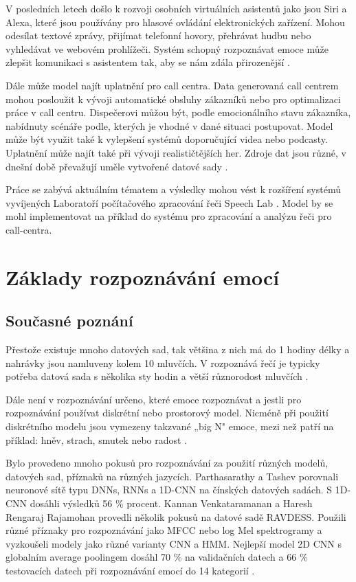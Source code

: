 \documentclass[FM,BP]{tulthesis}
\begin{document}
V posledních letech došlo k rozvoji osobních virtuálních asistentů jako jsou Siri a Alexa, které jsou používány pro hlasové ovládání elektronických zařízení. Mohou odesílat textové zprávy, přijímat telefonní hovory, přehrávat hudbu nebo vyhledávat ve webovém prohlížeči. Systém schopný rozpoznávat emoce může zlepšit komunikaci s asistentem tak, aby se nám zdála přirozenější \cite{DBLP:journals/corr/abs-1912-10458}.

Dále může model najít uplatnění pro call centra. Data generovaná call centrem mohou posloužit k vývoji automatické obsluhy zákazníků nebo pro optimalizaci práce v call centru. Dispečerovi můžou být, podle emocionálního stavu zákazníka, nabídnuty scénáře podle, kterých je vhodné v dané situaci postupovat. Model může být využit také k vylepšení systémů doporučující videa nebo podcasty. Uplatnění může najít také při vývoji realističtějších her. Zdroje dat jsou různé, v dnešní době převažují uměle vytvořené datové sady \cite{konar_chakraborty_2015}.

Práce se zabývá aktuálním tématem a výsledky mohou vést k rozšíření systémů vyvíjených Laboratoří počítačového zpracování řeči Speech Lab \cite{speechlab}. Model by se mohl implementovat na příklad do systému pro zpracování a analýzu řeči pro call-centra.

\chapter{Základy rozpoznávání emocí}

\section{Současné poznání}
Přestože existuje mnoho datových sad, tak většina z nich má do 1 hodiny délky a nahrávky jsou namluveny kolem 10 mluvčích. V rozpoznává řečí je typicky potřeba datová sada s několika sty hodin a větší různorodost mluvčích \cite{konar_chakraborty_2015}.

Dále není v rozpoznávání určeno, které emoce rozpoznávat a jestli pro rozpoznávání používat diskrétní nebo prostorový model. Nicméně při použití diskrétního modelu jsou vymezeny takzvané „big N" emoce, mezi než patří na příklad: hněv, strach, smutek nebo radost \cite{konar_chakraborty_2015}.

Bylo provedeno mnoho pokusů pro rozpoznávání za použití různých modelů, datových sad, příznaků na různých jazycích. Parthasarathy a
Tashev porovnali neuronové sítě typu DNNs, RNNs a 1D-CNN na čínských datových sadách. S 1D-CNN dosáhli výsledků 56 \% procent. Kannan Venkataramanan a Haresh Rengaraj Rajamohan provedli několik pokusů na datové sadě RAVDESS. Použili různé příznaky pro rozpoznávání jako MFCC nebo log Mel spektrogramy a vyzkoušeli modely jako různé varianty CNN a HMM. Nejlepší model 2D CNN s globalním average poolingem dosáhl 70 \% na validačních datech a 66 \% testovacích datech při rozpoznávání emocí do 14 kategorií \cite{DBLP:journals/corr/abs-1912-10458}.
\end{document}
